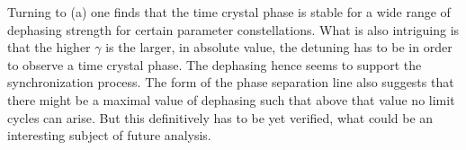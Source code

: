     Turning to (a) one finds that the time crystal phase is stable for a wide range of dephasing strength for certain parameter constellations. What is also intriguing is that the higher $\gamma$ is the larger, in absolute value, the detuning has to be in order to observe a time crystal phase. The dephasing hence seems to support the synchronization process. The form of the phase separation line also suggests that there might be a maximal value of dephasing such that above that value no limit cycles can arise. But this definitively has to be yet verified, what could be an interesting subject of future analysis.

    


